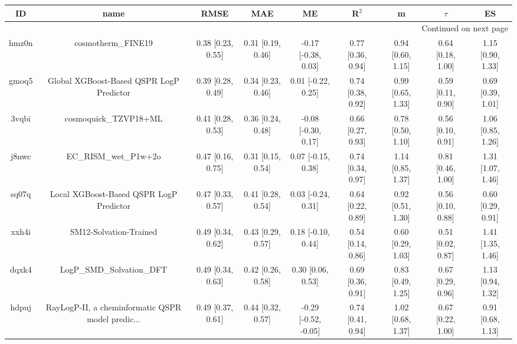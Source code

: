 \documentclass{article}
\begin{document}
\begin{center}
\scriptsize
\begin{longtable}{|ccccccccc|}
\toprule
    ID &                                               name &               RMSE &                MAE &                    ME &              R$^2$ &                    m &               $\tau$ &                    ES \\
\midrule
\endhead
\midrule
\multicolumn{9}{r}{{Continued on next page}} \\
\midrule
\endfoot

\bottomrule
\endlastfoot
 hmz0n &                                 cosmotherm\_FINE19 &  0.38 [0.23, 0.55] &  0.31 [0.19, 0.46] &   -0.17 [-0.38, 0.03] &  0.77 [0.36, 0.94] &    0.94 [0.60, 1.15] &    0.64 [0.18, 1.00] &     1.15 [0.90, 1.33] \\
 gmoq5 &           Global XGBoost-Based QSPR LogP Predictor &  0.39 [0.28, 0.49] &  0.34 [0.23, 0.46] &    0.01 [-0.22, 0.25] &  0.74 [0.38, 0.92] &    0.99 [0.65, 1.33] &    0.59 [0.11, 0.90] &     0.69 [0.39, 1.01] \\
 3vqbi &                              cosmoquick\_TZVP18+ML &  0.41 [0.28, 0.53] &  0.36 [0.24, 0.48] &   -0.08 [-0.30, 0.17] &  0.66 [0.27, 0.93] &    0.78 [0.50, 1.10] &    0.56 [0.10, 0.91] &     1.06 [0.85, 1.26] \\
 j8nwc &                              EC\_RISM\_wet\_P1w+2o &  0.47 [0.16, 0.75] &  0.31 [0.15, 0.54] &    0.07 [-0.15, 0.38] &  0.74 [0.34, 0.97] &    1.14 [0.85, 1.37] &    0.81 [0.46, 1.00] &     1.31 [1.07, 1.46] \\
 sq07q &            Local XGBoost-Based QSPR LogP Predictor &  0.47 [0.33, 0.57] &  0.41 [0.28, 0.54] &    0.03 [-0.24, 0.31] &  0.64 [0.22, 0.89] &    0.92 [0.51, 1.30] &    0.56 [0.10, 0.88] &     0.60 [0.29, 0.91] \\
 xxh4i &                             SM12-Solvation-Trained &  0.49 [0.34, 0.62] &  0.43 [0.29, 0.57] &    0.18 [-0.10, 0.44] &  0.54 [0.14, 0.86] &    0.60 [0.29, 1.03] &    0.51 [0.02, 0.87] &     1.41 [1.35, 1.46] \\
 dqxk4 &                          LogP\_SMD\_Solvation\_DFT &  0.49 [0.34, 0.63] &  0.42 [0.26, 0.58] &     0.30 [0.06, 0.53] &  0.69 [0.36, 0.91] &    0.83 [0.49, 1.25] &    0.67 [0.29, 0.96] &     1.13 [0.94, 1.32] \\
 hdpuj &  RayLogP-II, a cheminformatic QSPR model predic... &  0.49 [0.37, 0.61] &  0.44 [0.32, 0.57] &  -0.29 [-0.52, -0.05] &  0.74 [0.41, 0.94] &    1.02 [0.68, 1.37] &    0.67 [0.22, 1.00] &     0.91 [0.68, 1.13] \\

\end{longtable}
\end{center}
\end{document}
